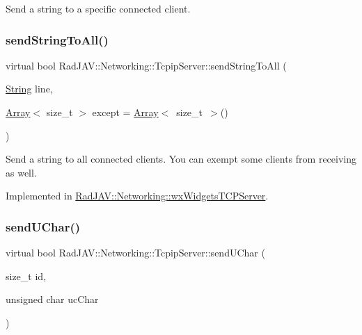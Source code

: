 Send a string to a specific connected client. \mbox{\label{class_rad_j_a_v_1_1_networking_1_1_tcpip_server_ab5ea43765510f9d8b9e242e676d5b70b}} 
\subsubsection{\texorpdfstring{send\+String\+To\+All()}{sendStringToAll()}}
{\footnotesize\ttfamily virtual bool Rad\+J\+A\+V\+::\+Networking\+::\+Tcpip\+Server\+::send\+String\+To\+All (\begin{DoxyParamCaption}\item[{\mbox{\hyperlink{class_rad_j_a_v_1_1_string}{String}}}]{line,  }\item[{\mbox{\hyperlink{class_rad_j_a_v_1_1_array}{Array}}$<$ size\+\_\+t $>$}]{except = {\ttfamily \mbox{\hyperlink{class_rad_j_a_v_1_1_array}{Array}}$<$~size\+\_\+t~$>$()} }\end{DoxyParamCaption})\hspace{0.3cm}{\ttfamily [pure virtual]}}

Send a string to all connected clients. You can exempt some clients from receiving as well. 

Implemented in \mbox{\hyperlink{class_rad_j_a_v_1_1_networking_1_1wx_widgets_t_c_p_server_aeca58079e59ba29af8d74292c4312bc7}{Rad\+J\+A\+V\+::\+Networking\+::wx\+Widgets\+T\+C\+P\+Server}}.

\mbox{\label{class_rad_j_a_v_1_1_networking_1_1_tcpip_server_afd54d5c1dc235937aca670bbd9b86875}} 
\subsubsection{\texorpdfstring{send\+U\+Char()}{sendUChar()}}
{\footnotesize\ttfamily virtual bool Rad\+J\+A\+V\+::\+Networking\+::\+Tcpip\+Server\+::send\+U\+Char (\begin{DoxyParamCaption}\item[{size\+\_\+t}]{id,  }\item[{unsigned char}]{uc\+Char }\end{DoxyParamCaption})\hspace{0.3cm}{\ttfamily [pure virtual]}}

